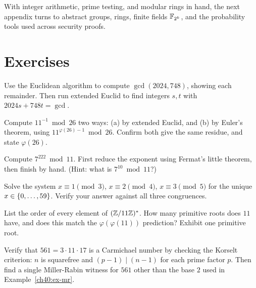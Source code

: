 With integer arithmetic, prime testing, and modular rings in hand, the next appendix turns to abstract groups, rings, finite fields $\mathbb{F}_{2^k}$, and the probability tools used across security proofs.

\section{Exercises}
\label{ch40:exercises}

\begin{exercise}
\label{ch40:ex-gcd}
Use the Euclidean algorithm to compute $\gcd(2024, 748)$, showing each remainder. Then run extended
Euclid to find integers $s,t$ with $2024s + 748t = \gcd$.
\end{exercise}

\begin{exercise}
\label{ch40:ex-inverse}
Compute $11^{-1}\bmod 26$ two ways: (a) by extended Euclid, and (b) by Euler's theorem, using
$11^{\varphi(26)-1}\bmod 26$. Confirm both give the same residue, and state $\varphi(26)$.
\end{exercise}

\begin{exercise}
\label{ch40:ex-modexp2}
Compute $7^{222}\bmod 11$. First reduce the exponent using Fermat's little theorem, then finish by
hand. (Hint: what is $7^{10}\bmod 11$?)
\end{exercise}

\begin{exercise}
\label{ch40:ex-crt2}
Solve the system $x\equiv 1\pmod 3$, $x\equiv 2\pmod 4$, $x\equiv 3\pmod 5$ for the unique
$x\in\{0,\dots,59\}$. Verify your answer against all three congruences.
\end{exercise}

\begin{exercise}
\label{ch40:ex-order2}
List the order of every element of $(\mathbb{Z}/11\mathbb{Z})^{*}$. How many primitive roots does $11$ have, and does
this match the $\varphi(\varphi(11))$ prediction? Exhibit one primitive root.
\end{exercise}

\begin{exercise}
\label{ch40:ex-carmichael}
Verify that $561 = 3\cdot 11\cdot 17$ is a Carmichael number by checking the Korselt criterion: $n$
is squarefree and $(p-1)\mid(n-1)$ for each prime factor $p$. Then find a single Miller-Rabin witness
for $561$ other than the base $2$ used in Example~\ref{ch40:ex-mr}.
\end{exercise}

